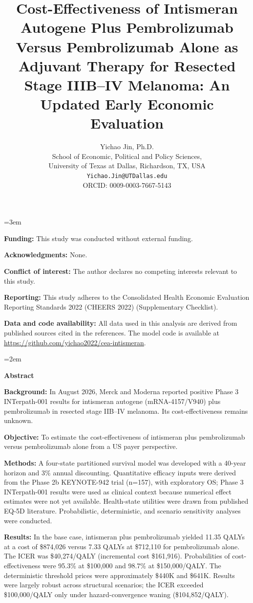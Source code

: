 \documentclass[12pt,a4paper]{article}
\title{\textbf{Cost-Effectiveness of Intismeran Autogene Plus Pembrolizumab Versus Pembrolizumab Alone as Adjuvant Therapy for Resected Stage IIIB–IV Melanoma: An Updated Early Economic Evaluation}}
\author{Yichao Jin, Ph.D. \\
  School of Economic, Political and Policy Sciences, \\
  University of Texas at Dallas, Richardson, TX, USA \\
  \texttt{Yichao.Jin@UTDallas.edu} \\
  ORCID: 0009-0003-7667-5143}
\date{}
\begin{document}
\emergencystretch=3em
\hfuzz=1pt

\maketitle
\thispagestyle{empty}

{\noindent\small
\textbf{Funding:} This study was conducted without external funding.

\textbf{Acknowledgments:} None.

\textbf{Conflict of interest:} The author declares no competing interests relevant to this study.

\textbf{Reporting:} This study adheres to the Consolidated Health Economic Evaluation Reporting Standards 2022 (CHEERS 2022) \cite{husereau2022} (Supplementary Checklist).

\textbf{Data and code availability:} All data used in this analysis are derived from published sources cited in the references. The model code is available at \url{https://github.com/yichao2022/cea-intismeran}.
}

\newpage

\begingroup
\onehalfspacing
\emergencystretch=2em
\setlength{\parindent}{0pt}
\begin{center}
{\large\bfseries Abstract}
\end{center}

\textbf{Background:} In August 2026, Merck and Moderna reported positive Phase 3 \mbox{INTerpath-001} results for intismeran autogene (mRNA-4157/V940) plus \mbox{pembrolizumab} in resected stage IIB--IV melanoma. Its cost-effectiveness remains unknown.

\textbf{Objective:} To estimate the cost-effectiveness of intismeran plus \mbox{pembrolizumab} versus \mbox{pembrolizumab} alone from a US payer perspective.

\textbf{Methods:} A four-state partitioned survival model was developed with a 40-year horizon and 3\% annual discounting. Quantitative efficacy inputs were derived from the Phase 2b \mbox{KEYNOTE-942} trial (n=157), with exploratory OS; Phase 3 \mbox{INTerpath-001} results were used as clinical context because numerical effect estimates were not yet available. Health-state utilities were drawn from published EQ-5D literature. Probabilistic, deterministic, and scenario sensitivity analyses were conducted.

\textbf{Results:} In the base case, intismeran plus \mbox{pembrolizumab} yielded 11.35 QALYs at a cost of \$874,026 versus 7.33 QALYs at \$712,110 for \mbox{pembrolizumab} alone. The ICER was \$40,274/QALY (incremental cost \$161,916). Probabilities of cost-effectiveness were 95.3\% at \$100,000 and 98.7\% at \$150,000/QALY. The deterministic threshold prices were approximately \$440K and \$641K. Results were largely robust across structural scenarios; the ICER exceeded \$100,000/QALY only under hazard-convergence waning (\$104,852/QALY).
\end{document}
